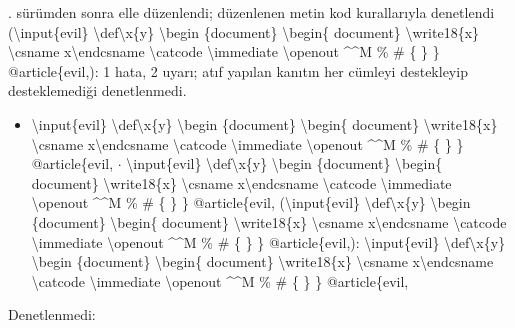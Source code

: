 \documentclass[journal]{IEEEtran}
\begin{document}
. sürümden sonra elle düzenlendi; düzenlenen metin kod kurallarıyla denetlendi (\textbackslash{}input\{evil\} \textbackslash{}def\textbackslash{}x\{y\} \textbackslash{}begin \{document\} \textbackslash{}begin\{ document\} \textbackslash{}write18\{x\} \textbackslash{}csname x\textbackslash{}endcsname \textbackslash{}catcode \textbackslash{}immediate \textbackslash{}openout \textasciicircum{}\textasciicircum{}M \% \# \{ \} \} @article\{evil,): 1 hata, 2 uyarı; atıf yapılan kanıtın her cümleyi destekleyip desteklemediği denetlenmedi.

\begin{itemize}
\item \textbackslash{}input\{evil\} \textbackslash{}def\textbackslash{}x\{y\} \textbackslash{}begin \{document\} \textbackslash{}begin\{ document\} \textbackslash{}write18\{x\} \textbackslash{}csname x\textbackslash{}endcsname \textbackslash{}catcode \textbackslash{}immediate \textbackslash{}openout \textasciicircum{}\textasciicircum{}M \% \# \{ \} \} @article\{evil, \ensuremath{\cdot} \textbackslash{}input\{evil\} \textbackslash{}def\textbackslash{}x\{y\} \textbackslash{}begin \{document\} \textbackslash{}begin\{ document\} \textbackslash{}write18\{x\} \textbackslash{}csname x\textbackslash{}endcsname \textbackslash{}catcode \textbackslash{}immediate \textbackslash{}openout \textasciicircum{}\textasciicircum{}M \% \# \{ \} \} @article\{evil, (\textbackslash{}input\{evil\} \textbackslash{}def\textbackslash{}x\{y\} \textbackslash{}begin \{document\} \textbackslash{}begin\{ document\} \textbackslash{}write18\{x\} \textbackslash{}csname x\textbackslash{}endcsname \textbackslash{}catcode \textbackslash{}immediate \textbackslash{}openout \textasciicircum{}\textasciicircum{}M \% \# \{ \} \} @article\{evil,): \textbackslash{}input\{evil\} \textbackslash{}def\textbackslash{}x\{y\} \textbackslash{}begin \{document\} \textbackslash{}begin\{ document\} \textbackslash{}write18\{x\} \textbackslash{}csname x\textbackslash{}endcsname \textbackslash{}catcode \textbackslash{}immediate \textbackslash{}openout \textasciicircum{}\textasciicircum{}M \% \# \{ \} \} @article\{evil,
\end{itemize}

\noindent Denetlenmedi:
\end{document}
